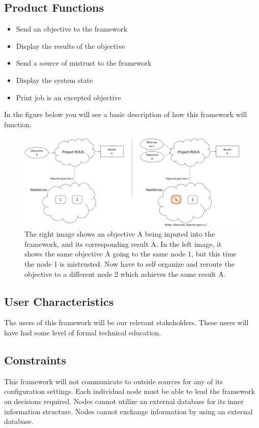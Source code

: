 \documentclass[draftclsnofoot, onecolumn, compsoc, 10pt]{IEEEtran}
\begin{document}
\subsection{Product Functions}
\begin{itemize}
\item Send an objective to the framework
\item Display the results of the objective
\item Send a source of mistrust to the framework
\item Display the system state 
\item Print job is an excepted objective
\end{itemize}
In the figure below you will see a basic description of how this framework will function. 
\begin{figure}[!htb]
  \centering
    \includegraphics[width=1.0\textwidth]{img_zoom}
  \caption{The right image shows an objective A being inputed into the framework, and its corresponding result A. In the left image, it shows the same objective A going to the same node 1, but this time the node 1 is mistrusted. Now have to self organize and reroute the objective to a different node 2 which achieves the same result A. }
\end{figure}
\FloatBarrier

\subsection{User Characteristics} 
The users of this framework will be our relevant stakeholders. These users will have had some level of formal technical education.

\subsection{Constraints}
This framework will not communicate to outside sources for any of its configuration settings. Each individual node must be able to lead the framework on decisions required. Nodes cannot utilize an external database for its inner information structure. Nodes cannot exchange information by using an external database.
\end{document}
